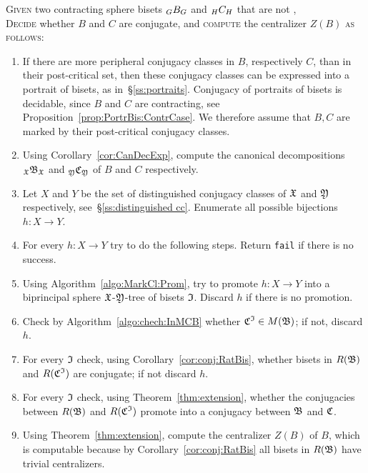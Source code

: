 \documentclass{amsart}
\begin{document}
\begin{algo}\label{algo:DecidExp}
  \textsc{Given} two contracting sphere bisets $\subscript {G}B_{G}$ and  $\subscript {H}C_{H}$ that are not \Tor,\\
  \textsc{Decide} whether $B$ and $C$ are conjugate, and \textsc{compute} the centralizer $Z(B)$ \textsc{as
    follows:}\\\upshape
 \begin{enumerate}
 \item If there are more peripheral conjugacy classes in $B$,
   respectively $C$, than in their post-critical set, then these
   conjugacy classes can be expressed into a portrait of bisets, as
   in~\S\ref{ss:portraits}. Conjugacy of portraits of bisets is
   decidable, since $B$ and $C$ are contracting, see
   Proposition~\ref{prop:PortrBis:ContrCase}. We therefore assume that
   $B,C$ are marked by their post-critical conjugacy classes.
 \item Using Corollary~\ref{cor:CanDecExp}, compute the canonical 
   decompositions $\subscript \gf\gfB_\gf$ and
   $\subscript \gfY\gfC_\gfY$ of $B$ and $C$
   respectively.
 \item Let $X$ and $Y$ be the set of distinguished conjugacy classes
   of ${\mathfrak X}$ and ${\mathfrak Y}$ respectively, see~\S\ref{ss:distinguished
     cc}. Enumerate all possible bijections $h\colon X\to Y$.
 \item For every $h\colon X\to Y$ try to do the following
   steps. Return \texttt{fail} if there is no success.
 \item Using Algorithm~\ref{algo:MarkCl:Prom}, try to promote
   $h\colon X\to Y$ into a biprincipal sphere ${\mathfrak X}$-${\mathfrak Y}$-tree of
   bisets ${\mathfrak I}$. Discard $h$ if there is no promotion.
 \item Check by Algorithm~\ref{algo:chech:InMCB} whether
   ${\mathfrak C}^{\mathfrak I} \in M({\mathfrak B})$; if not, discard
   $h$.
 \item For every ${\mathfrak I}$ check, using
   Corollary~\ref{cor:conj:RatBis}, whether bisets in
   $R({\mathfrak B})$ and $R({\mathfrak C}^{\mathfrak I})$ are conjugate;
   if not discard $h$.
 \item For every ${\mathfrak I}$ check, using Theorem~\ref{thm:extension},
   whether the conjugacies between $R({\mathfrak B})$ and $R({\mathfrak C}^{\mathfrak I})$
   promote into a conjugacy between ${\mathfrak B}$ and ${\mathfrak C}$.
 \item Using Theorem~\ref{thm:extension}, compute the centralizer
   $Z(B)$ of $B$, which is computable because by
   Corollary~\ref{cor:conj:RatBis} all bisets in $R({\mathfrak B})$
   have trivial centralizers.
 \end{enumerate}
\end{algo}
\end{document}
